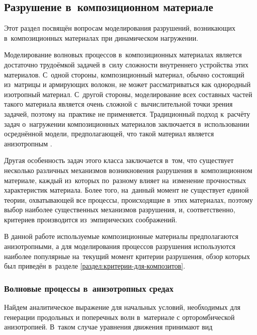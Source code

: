 \documentclass[thesis.tex]{subfiles}
\begin{document}
\FloatBarrier
\subsection{Разрушение в~композиционном материале}

Этот раздел посвящён вопросам моделирования разрушений, возникающих в~композиционных материалах при динамическом
нагружении.

Моделирование волновых процессов в~композиционных материалах является достаточно трудоёмкой задачей в~силу сложности
внутреннего устройства этих материалов. С~одной стороны, композиционный материал, обычно состоящий из~матрицы и
армирующих волокон, не может рассматриваться как однородный изотропный
\cite{беклемышева2013численное,беклемышева2013численное2,беклемышева2013численное3,беклемышева2012численное,беклемышева2014численное}
материал. С~другой стороны, моделирование всех составных частей такого материала является очень сложной с~вычислительной
точки зрения задачей, поэтому на~практике не применяется. Традиционный подход к~расчёту задач о~нагружении
композиционных материалов заключается в~использовании осреднённой модели, предполагающей, что такой материал является
анизотропным \cite{петров2014численный}.

Другая особенность задач этого класса заключается в~том, что существует несколько различных механизмов возникновения
разрушения в~композиционном материале, каждый из~которых по~разному влияет на~изменение прочностных характеристик
материала. Более того, на~данный момент не существует \cite{kaddour2013maturity} единой теории, охватывающей все
процессы, происходящие в~этих материалах, поэтому выбор наиболее существенных механизмов разрушения, и, соответственно,
критериев производится из~эмпирических соображений.

В данной работе используемые композиционные материалы предполагаются анизотропными, а для моделирования процессов
разрушения используются наиболее популярные на~текущий момент критерии разрушения, обзор которых был приведён в~разделе
\ref{раздел:критерии-для-композитов}.

\subsubsection{Волновые процессы в~анизотропных средах}

Найдем аналитическое выражение для начальных условий, необходимых для генерации продольных и поперечных волн в~материале
с орторомбической анизотропией. В~таком случае уравнения движения принимают вид
\end{document}
